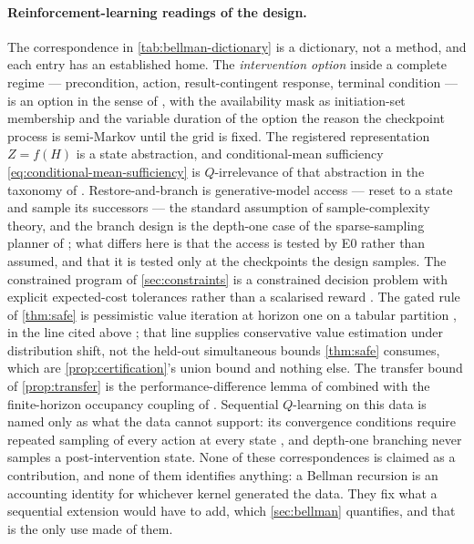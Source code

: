 \paragraph{Reinforcement-learning readings of the design.}
The correspondence in \cref{tab:bellman-dictionary} is a dictionary, not a
method, and each entry has an established home.  The \emph{intervention option}
inside a complete regime --- precondition, action, result-contingent response,
terminal condition --- is an option in the sense of \citet{sutton1999}, with the
availability mask as initiation-set membership and the variable duration of the
option the reason the checkpoint process is semi-Markov until the grid is fixed.
The registered representation $Z=f(H)$ is a state abstraction, and
conditional-mean sufficiency \eqref{eq:conditional-mean-sufficiency} is
$Q$-irrelevance of that abstraction in the taxonomy of \citet{li2006}.
Restore-and-branch is generative-model access --- reset to a state and sample its
successors --- the standard assumption of sample-complexity theory, and the
branch design is the depth-one case of the sparse-sampling planner of
\citet{kearns2002sparse}; what differs here is that the access is tested by E0
rather than assumed, and that it is tested only at the checkpoints the design
samples.  The constrained program of \cref{sec:constraints} is a constrained
decision problem with explicit expected-cost tolerances rather than a
scalarised reward \citep{achiam2017}.  The gated rule of \cref{thm:safe} is
pessimistic value iteration at horizon one on a tabular partition
\citep{jin2021}, in the line cited above \citep{laroche2019,kumar2020,xie2021};
that line supplies conservative value estimation under distribution shift, not
the held-out simultaneous bounds \cref{thm:safe} consumes, which are
\cref{prop:certification}'s union bound and nothing else.  The transfer bound of
\cref{prop:transfer} is the performance-difference lemma of \citet{kakade2002}
combined with the finite-horizon occupancy coupling of \citet{kearnssingh2002}.
Sequential $Q$-learning on this data is named only as what the data cannot
support: its convergence conditions require repeated sampling of every action at
every state \citep{watkins1992}, and depth-one branching never samples a
post-intervention state.  None of these correspondences is claimed as a
contribution, and none of them identifies anything: a Bellman recursion is an
accounting identity for whichever kernel generated the data.  They fix what a
sequential extension would have to add, which \cref{sec:bellman} quantifies, and
that is the only use made of them.

